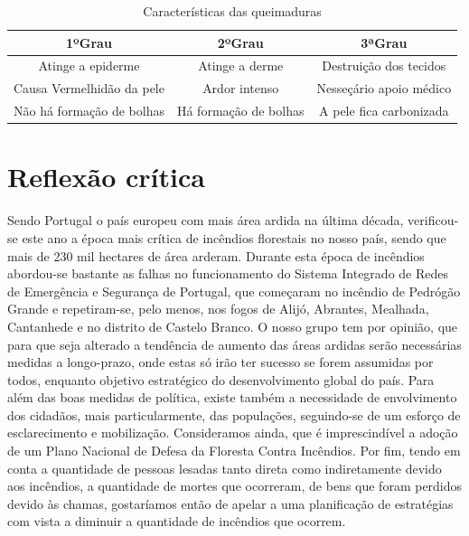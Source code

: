 \documentclass{report}
\begin{document}
\begin{table}
\caption{Características das queimaduras}
\centering
\begin{tabular}{|c||c||c|}
\hline  
   \textbf{1ºGrau}	  	&  \textbf{2ºGrau}	  &  \textbf{3ªGrau}		 \\  \hline
   Atinge a epiderme		&  Atinge a derme         &  Destruição dos tecidos \\  \hline
   Causa Vermelhidão da pele   	&  Ardor intenso	  &  Nesseçário apoio médico \\  \hline
   Não há formação de bolhas    &  Há formação de bolhas  &  A pele fica carbonizada \\  \hline
\end{tabular}
\label{tab2}
\end{table}
 
\chapter{Reflexão crítica}
Sendo Portugal o país europeu com mais área ardida na última década, verificou-se este ano a época mais crítica de incêndios florestais no nosso país, sendo que mais de 230 mil hectares de área arderam.
Durante esta época de incêndios abordou-se bastante as falhas no funcionamento do Sistema Integrado de Redes de Emergência e Segurança de Portugal, que começaram no incêndio de Pedrógão Grande e repetiram-se, pelo menos, nos fogos de Alijó, Abrantes, Mealhada, Cantanhede e no distrito de Castelo Branco.
O nosso grupo tem por opinião, que para que seja alterado a tendência de aumento das áreas ardidas serão necessárias medidas a longo-prazo, onde estas só irão ter sucesso se forem assumidas por todos, enquanto objetivo estratégico do desenvolvimento global do país.
Para além das boas medidas de política, existe também a necessidade de envolvimento dos cidadãos, mais particularmente, das populações, seguindo-se de um esforço de esclarecimento e mobilização.
Consideramos ainda, que é imprescindível a adoção de um Plano Nacional de Defesa da Floresta Contra Incêndios.
Por fim, tendo em conta a quantidade de pessoas lesadas tanto direta como indiretamente devido aos incêndios, a quantidade de mortes que ocorreram, de bens que foram perdidos devido às chamas, gostaríamos então de apelar a uma planificação de estratégias com vista a diminuir a quantidade de incêndios que ocorrem. 




\end{document}
